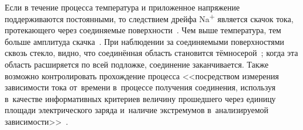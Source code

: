 Если в течение процесса температура и приложенное напряжение поддерживаются
постоянными, то следствием дрейфа Na\textsuperscript{$+$} является скачок
тока, протекающего через соединяемые
поверхности~\cite{Lee_Detailed_characterization}. Чем выше температура, тем
больше амплитуда скачка~\cite{Khomenko1990physprocess, Cozma_Puers_1995,
Low_temp_wafer_AB}. При наблюдении за соединяемыми поверхностями сквозь
стекло, видно, что соединённая область становится
тёмносерой~\cites[484]{lit_madou2002fundamentals}{Khomenko1990physprocess}; когда
эта область расширяется по всей подложке, соединение заканчивается.
Также возможно контролировать прохождение процесса
<<посредством измерения зависимости тока от~времени
в~процессе получения соединения, используя в~качестве
информативных критериев величину прошедшего через единицу
площади электрического заряда и~наличие экстремумов
в~анализируемой зависимости>>~\cites[23]{pshchelko2011_avtoref}.
